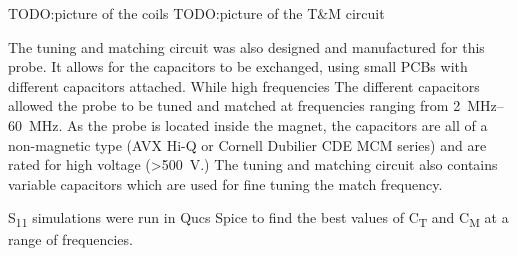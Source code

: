 TODO:picture of the coils
TODO:picture of the T\&M circuit

The tuning and matching circuit was also designed and manufactured for this probe.
It allows for the capacitors to be exchanged, using small PCBs with different capacitors attached.
While high frequencies
The different capacitors allowed the probe to be tuned and matched at frequencies ranging from \SIrange{2}{60}{\mega\hertz}.
As the probe is located inside the magnet, the capacitors are all of a non-magnetic type (AVX Hi-Q or Cornell Dubilier CDE MCM series) and are rated for high voltage (\textgreater\SI{500}{V}.)
The tuning and matching circuit also contains variable capacitors which are used for fine tuning the match frequency.

S\textsubscript{11} simulations were run in Qucs Spice to find the best values of C\textsubscript{T} and C\textsubscript{M} at a range of frequencies.
